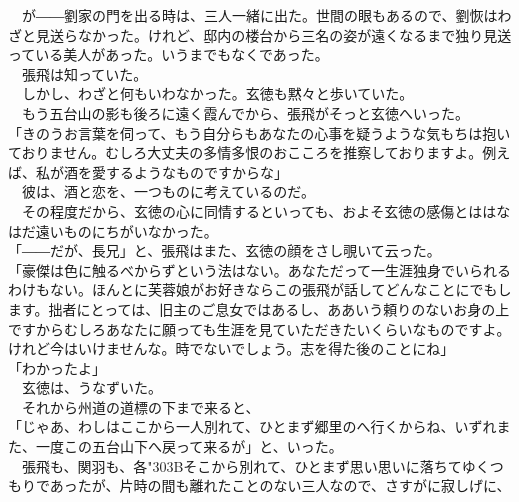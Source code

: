 \documentclass[
  paper=a5,
  fontsize=10pt,
  jafontsize=9.5pt,
  tate,                  %
  open_bracket_pos=nibu, %
]{jlreq}
\begin{document}
　が――劉家の門を出る時は、三人一緒に出た。世間の眼もあるので、劉恢はわざと見送らなかった。けれど、邸内の楼台から三名の姿が遠くなるまで独り見送っている美人があった。いうまでもなくであった。\\


　張飛は知っていた。\\


　しかし、わざと何もいわなかった。玄徳も黙々と歩いていた。\\


　もう五台山の影も後ろに遠く霞んでから、張飛がそっと玄徳へいった。\\


「きのうお言葉を伺って、もう自分らもあなたの心事を疑うような気もちは抱いておりません。むしろ大丈夫の多情多恨のおこころを推察しておりますよ。例えば、私が酒を愛するようなものですからな」\\


　彼は、酒と恋を、一つものに考えているのだ。\\


　その程度だから、玄徳の心に同情するといっても、およそ玄徳の感傷とははなはだ遠いものにちがいなかった。\\


「――だが、長兄」と、張飛はまた、玄徳の顔をさし覗いて云った。\\


「豪傑は色に触るべからずという法はない。あなただって一生涯独身でいられるわけもない。ほんとに芙蓉娘がお好きならこの張飛が話してどんなことにでもします。拙者にとっては、旧主のご息女ではあるし、ああいう頼りのないお身の上ですからむしろあなたに願っても生涯を見ていただきたいくらいなものですよ。けれど今はいけませんな。時でないでしょう。志を得た後のことにね」\\


「わかったよ」\\


　玄徳は、うなずいた。\\


　それから州道の道標の下まで来ると、\\


「じゃあ、わしはここから一人別れて、ひとまず郷里のへ行くからね、いずれまた、一度この五台山下へ戻って来るが」と、いった。\\


　張飛も、関羽も、各{\char"303B}そこから別れて、ひとまず思い思いに落ちてゆくつもりであったが、片時の間も離れたことのない三人なので、さすがに寂しげに、\\
\end{document}
